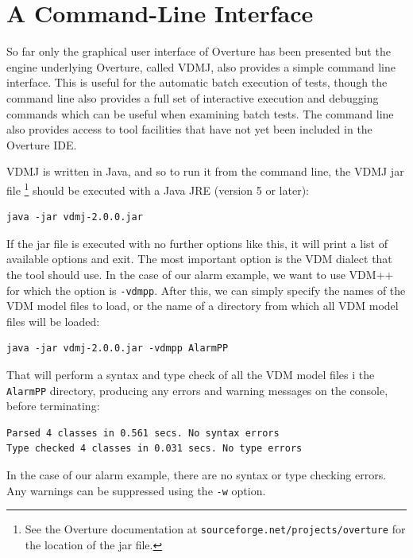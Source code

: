 \section{A Command-Line Interface}\label{sec:cmdline}

So far only the graphical user interface of Overture has been
presented but the engine underlying Overture, called VDMJ, also
provides a simple command line interface.  This is useful for the
automatic batch execution of tests, though the command line also
provides a full set of interactive execution and debugging commands
which can be useful when examining batch tests. The command line also
provides access to tool facilities that have not yet been included in
the Overture IDE.

VDMJ is written in Java, and so to run it from the command line, the
VDMJ jar file \footnote{See the Overture documentation at
  \texttt{sourceforge.net/projects/overture} for the location of the
  jar file.}  should be executed with a Java JRE (version 5 or later):

\lstset{style=tool,language=}
\begin{lstlisting}
java -jar vdmj-2.0.0.jar
\end{lstlisting}

\noindent If the jar file is executed with no further options like this, it will
print a list of available options and exit. The most important option is the VDM
dialect that the tool should use. In the case of our alarm example, we want to
use VDM++ for which the option is \verb|-vdmpp|. After this, we can simply
specify the names of the VDM model files to load, or the name of a
directory from which all VDM model files will be loaded:

\begin{lstlisting}
java -jar vdmj-2.0.0.jar -vdmpp AlarmPP
\end{lstlisting}

\noindent That will perform a syntax and type check of all the
VDM model files i the \verb|AlarmPP| directory, producing any
errors and warning messages on the console, before terminating:

\begin{lstlisting}
Parsed 4 classes in 0.561 secs. No syntax errors
Type checked 4 classes in 0.031 secs. No type errors
\end{lstlisting}

\noindent In the case of our alarm example, there are no syntax or
type checking errors. Any warnings can be suppressed using the
\verb|-w| option.

